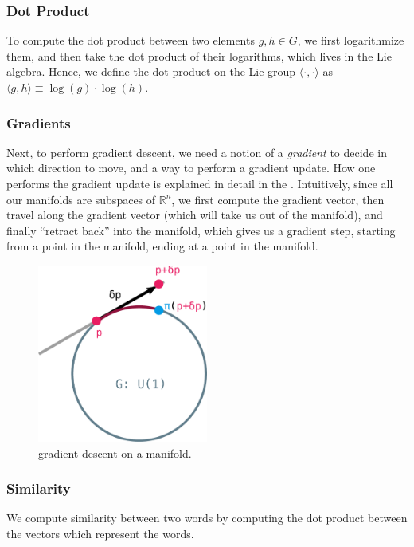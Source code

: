 \documentclass[11pt]{book}
\begin{document}
\subsubsection{Dot Product}  To compute the dot product between two elements $g, h \in G$, we first logarithmize
them, and then take the dot product of their logarithms, which lives in the Lie algebra.
Hence, we define the dot product on the Lie group $\langle \cdot , \cdot \rangle$ as
$\langle g, h \rangle \equiv \log(g) \cdot \log(h)$.


\subsubsection{Gradients} Next, to perform gradient descent, we need
a notion of a \emph{gradient} to decide in which direction to move, and a way to perform a gradient update.
How one performs the gradient update is explained in detail in the \label{section:optim-on-riem}. Intuitively,
since all our manifolds are subspaces of $\mathbb R^n$, we first compute the gradient vector, then travel
along the gradient vector (which will take us out of the manifold), and finally ``retract back'' into the
manifold, which gives us a gradient step, starting from a point in the manifold, ending at a point in the manifold.

\begin{figure}[htb]
\includegraphics[width=0.5\textwidth]{./gradient-manifold.pdf}
\caption{gradient descent on a manifold.}
\end{figure}


\subsubsection{Similarity} We compute similarity between two words by computing the dot product between
the vectors which represent the words.
\end{document}
